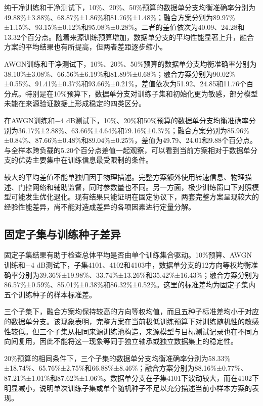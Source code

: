 \documentclass[UTF8,12pt,openany,twoside]{ctexbook}
\numberwithin{equation}{chapter}
\begin{document}
纯干净训练和干净测试下，10\%、20\%、50\%预算的数据单分支均衡准确率分别为49.88\%±3.88\%、68.87\%±1.86\%和81.76\%±1.48\%；融合方案分别为89.97\%±1.15\%、93.15\%±0.12\%和95.08\%±0.28\%。二者的差值依次为40.09、24.28和13.32个百分点。随着来源训练预算增加，数据单分支的平均性能显著上升，融合方案的平均结果也有所提高，但两者差距逐步缩小。

AWGN训练和干净测试下，10\%、20\%、50\%预算的数据单分支均衡准确率分别为38.10\%±3.08\%、66.56\%±6.19\%和81.89\%±0.68\%；融合方案分别为90.02\%±0.55\%、91.41\%±0.37\%和93.66\%±0.21\%，差值依次为51.92、24.85和11.76个百分点。特别是在10\%预算下，数据单分支对训练子集和初始化更为敏感，部分模型未能在来源验证数据上形成稳定的四类区分。

在AWGN训练和−4 dB测试下，10\%、20\%和50\%预算的数据单分支均衡准确率分别为36.17\%±2.88\%、63.66\%±4.64\%和79.16\%±0.37\%；融合方案分别为85.96\%±0.84\%、87.66\%±0.48\%和89.04\%±0.25\%，差值为49.79、24.01和9.88个百分点。与全样本跨负载的5.20个百分点差值一起观察，可以看到当前方案相对于数据单分支的优势主要集中在训练信息最受限制的条件。

较大的平均差值不能单独归因于物理描述。完整方案额外使用转速信息、物理描述、门控网络和辅助监督，同时参数量也不同。另一方面，极少训练窗口下对照模型可能发生优化退化。现有结果只能证明在固定协议下，两套完整方案呈现较大的经验性能差异，尚不能对造成差异的各项因素进行定量分解。

\subsection{固定子集与训练种子差异}\label{ux56faux5b9aux5b50ux96c6ux4e0eux8badux7ec3ux79cdux5b50ux5deeux5f02}

固定子集结果有助于检查总体平均是否由单个训练集合驱动。10\%预算、AWGN训练和−4 dB测试下，子集4101、4102和4103中，数据单分支的12方向等权均衡准确率分别为39.36\%±19.98\%、33.74\%±13.26\%和35.42\%±16.43\%；融合方案分别为86.57\%±0.59\%、85.01\%±0.38\%和86.32\%±0.52\%。这里的标准差均为固定子集内五个训练种子的样本标准差。

三个子集下，融合方案均保持较高的方向等权均值，而且五种子标准差均小于对应的数据单分支。该现象表明，完整方案在当前极低训练预算下对训练随机性的敏感性较低。但三个子集从相同来源训练池构造，来源模型与目标测试记录也在不同方向间复用，因此不能将这一现象等同于独立轴承或独立数据集上的稳定性。

20\%预算的相同条件下，三个子集的数据单分支均衡准确率分别为58.33\%±18.74\%、65.76\%±2.75\%和66.88\%±8.46\%；融合方案分别为88.16\%±0.77\%、87.21\%±1.01\%和87.62\%±1.06\%。数据单分支在子集4101下波动较大，而在4102下明显减小，说明单次训练子集或单个随机种子不足以充分描述当前小样本方案的表现。
\end{document}
